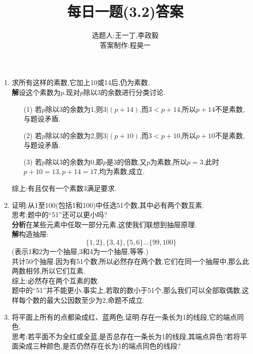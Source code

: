 \documentclass[UTF8]{ctexart}
\title{每日一题(3.2)答案}
\author{选题人:王一丁,李政毅\\答案制作:程昊一}
\begin{document}
\maketitle
\begin{enumerate}
\item {\large{}求所有这样的素数,它加上10或14后,仍为素数.}\\
\hspace*{2em}\textbf{解}\quad 设这个素数为$p$.现对$p$除以3的余数进行分类讨论.\\
\begin{itemize}
\item[(1)] 若$p$除以3的余数为1,则$3|(p+14)$,而$3<p+14$,所以$p+14$不是素数,与题设矛盾.\\
\item[(2)] 若$p$除以3的余数为2,则$3|(p+10)$,而$3<p+10$,所以$p+10$不是素数,与题设矛盾.\\
\item[(3)] 若$p$除以3的余数为0,即$p$是3的倍数,又$p$为素数,所以$p=3$.此时$p+10=13,p+14=17$,均为素数,成立.\\
\end{itemize}
\hspace*{2em}综上:有且仅有一个素数3满足要求.
\item {\large{}证明:从1至100(包括1和100)中任选51个数,其中必有两个数互素.\\
思考:题中的“51”还可以更小吗?}\\
\hspace*{2em}\textbf{分析}\quad 在某些元素中任取一部分元素,这使我们联想到抽屉原理.\\
\hspace*{2em}\textbf{解}\quad 构造抽屉:
\[\{1,2\},\{3,4\},\{5,6\}\dots\{99,100\}\]
(表示1和2为一个抽屉,3和4为一个抽屉,等等.)\\
\hspace*{2em}共计50个抽屉.因为有51个数,所以必然存在两个数,它们在同一个抽屉中,那么此两数相邻,所以它们互素.\\
\hspace*{2em}综上:必然存在两个互素的数.\\
\hspace*{2em}题中的“51”并不能更小.事实上,若取的数小于51个,那么我们可以全部取偶数,这样每个数的最大公因数至少为2,命题不成立.\\
\item {\large{}将平面上所有的点都染成红、蓝两色,证明:存在一条长为1的线段,它的端点同色.\\
思考:若平面不为全红或全蓝,是否总存在一条长为1的线段,其端点异色?若将平面染成三种颜色,是否仍然存在长为1的端点同色的线段?}\\

\end{enumerate}
\end{document}
